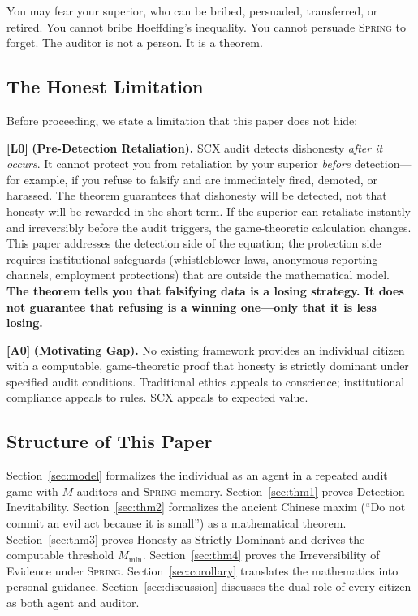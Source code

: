 \documentclass[11pt,a4paper]{article}
\theoremstyle{definition}
\theoremstyle{remark}
\newcommand{\assumptionTag}[1]{\textsf{\textbf{[A#1]}}}
\newcommand{\limitationTag}[1]{\textsf{\textbf{[L#1]}}}
\newcommand{\SCX}{\textsc{SCX}}
\newcommand{\Spring}{\textsc{Spring}}
\begin{document}
\medskip
You may fear your superior, who can be bribed, persuaded, transferred, or retired. You cannot bribe Hoeffding's inequality. You cannot persuade \Spring{} to forget. The auditor is not a person. It is a theorem.

\subsection{The Honest Limitation }

Before proceeding, we state a limitation that this paper does not hide:

\limitationTag{0} \textbf{(Pre-Detection Retaliation).} \SCX{} audit detects dishonesty \textit{after it occurs}. It cannot protect you from retaliation by your superior \textit{before} detection---for example, if you refuse to falsify and are immediately fired, demoted, or harassed. The theorem guarantees that dishonesty will be detected, not that honesty will be rewarded in the short term. If the superior can retaliate instantly and irreversibly before the audit triggers, the game-theoretic calculation changes. This paper addresses the detection side of the equation; the protection side requires institutional safeguards (whistleblower laws, anonymous reporting channels, employment protections) that are outside the mathematical model. \textbf{The theorem tells you that falsifying data is a losing strategy. It does not guarantee that refusing is a winning one---only that it is less losing.}

\assumptionTag{0} \textbf{(Motivating Gap).} No existing framework provides an individual citizen with a computable, game-theoretic proof that honesty is strictly dominant under specified audit conditions. Traditional ethics appeals to conscience; institutional compliance appeals to rules. \SCX{} appeals to expected value.

\subsection{Structure of This Paper }

Section~\ref{sec:model} formalizes the individual as an agent in a repeated audit game with $M$ auditors and \Spring{} memory. Section~\ref{sec:thm1} proves Detection Inevitability. Section~\ref{sec:thm2} formalizes the ancient Chinese maxim  (``Do not commit an evil act because it is small'') as a mathematical theorem. Section~\ref{sec:thm3} proves Honesty as Strictly Dominant and derives the computable threshold $M_{\min}$. Section~\ref{sec:thm4} proves the Irreversibility of Evidence under \Spring{}. Section~\ref{sec:corollary} translates the mathematics into personal guidance. Section~\ref{sec:discussion} discusses the dual role of every citizen as both agent and auditor.
\end{document}
